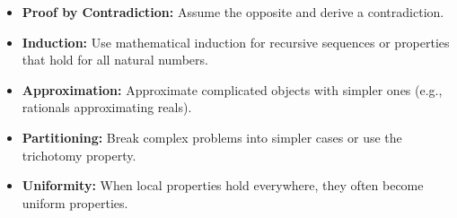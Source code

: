 \begin{itemize}
\item \textbf{Proof by Contradiction:} Assume the opposite and derive a contradiction.

\item \textbf{Induction:} Use mathematical induction for recursive sequences or properties that hold for all natural numbers.

\item \textbf{Approximation:} Approximate complicated objects with simpler ones (e.g., rationals approximating reals).

\item \textbf{Partitioning:} Break complex problems into simpler cases or use the trichotomy property.

\item \textbf{Uniformity:} When local properties hold everywhere, they often become uniform properties.
\end{itemize}
